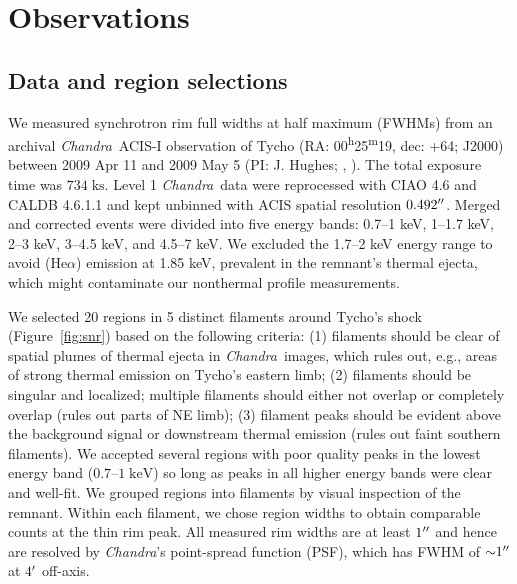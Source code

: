 \documentclass[iop, apj, numberedappendix]{emulateapj}
\newcommand*{\mt}{\mathrm}
\newcommand*{\unit}[1]{\;\mt{#1}}  %
\newcommand*{\abt}{\mathord{\sim}} %
\newcommand*{\tsup}{\textsuperscript}
\newcommand*{\Chandra}{\textit{Chandra}\ }
\begin{document}

\section{Observations}
\label{sec:observations}

\subsection{Data and region selections}
\label{sec:regions}

We measured synchrotron rim full widths at half maximum (FWHMs) from an
archival \Chandra ACIS-I observation of Tycho
(RA: 00\tsup{h}25\tsup{m}19, dec: +64; J2000)
between 2009 Apr 11 and 2009 May 5 (PI: J. Hughes;
,
).
The total exposure time was $734 \unit{ks}$.
Level 1 \Chandra data were reprocessed with CIAO 4.6 and CALDB 4.6.1.1 and kept
unbinned with ACIS spatial resolution $0.492\mbox{$^{\prime\prime}$}$.
Merged and corrected events were divided into five energy bands:
0.7--1 keV, 1--1.7 keV, 2--3 keV, 3--4.5 keV, and 4.5--7 keV.
We excluded the 1.7--2 keV energy range to avoid  (He$\alpha$)
emission at 1.85 keV, prevalent in the remnant's thermal ejecta, which
might contaminate our nonthermal profile measurements.

We selected 20 regions in 5 distinct filaments around Tycho's shock
(Figure~\ref{fig:snr}) based on the following criteria: (1) filaments should be
clear of spatial plumes of thermal ejecta in \Chandra images, which rules out,
e.g., areas of strong thermal emission on Tycho's eastern limb; (2) filaments
should be singular and localized; multiple filaments should either not
overlap or completely overlap (rules out parts of NE limb); (3) filament
peaks should be evident above the background signal or downstream thermal
emission (rules out faint southern filaments).  We accepted several
regions with poor quality peaks in the lowest energy band ($0.7$--$1
\unit{keV}$) so long as peaks in all higher energy bands were clear and
well-fit.  We grouped regions into filaments by visual inspection of the
remnant.  Within each filament, we chose region widths to obtain comparable
counts at the thin rim peak.  All measured rim widths are at least $1\mbox{$^{\prime\prime}$}$
and hence are resolved by \textit{Chandra}'s point-spread function (PSF), which
has FWHM of $\abt 1\arcsec$ at $4\mbox{$^\prime$}$ off-axis.
\end{document}
